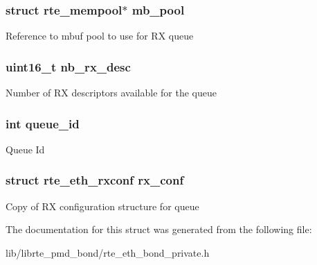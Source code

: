 \subsubsection[{mb\+\_\+pool}]{\setlength{\rightskip}{0pt plus 5cm}struct {\bf rte\+\_\+mempool}$\ast$ mb\+\_\+pool}\label{structbond__rx__queue_a25fec2758cbb0c178303a91f9b947de2}
Reference to mbuf pool to use for R\+X queue \hypertarget{structbond__rx__queue_aaa1aa505a27c4744f950365aafb99484}{}
\subsubsection[{nb\+\_\+rx\+\_\+desc}]{\setlength{\rightskip}{0pt plus 5cm}uint16\+\_\+t nb\+\_\+rx\+\_\+desc}\label{structbond__rx__queue_aaa1aa505a27c4744f950365aafb99484}
Number of R\+X descriptors available for the queue \hypertarget{structbond__rx__queue_a9069963fa1ce9797b853db16f9845d58}{}
\subsubsection[{queue\+\_\+id}]{\setlength{\rightskip}{0pt plus 5cm}int queue\+\_\+id}\label{structbond__rx__queue_a9069963fa1ce9797b853db16f9845d58}
Queue Id \hypertarget{structbond__rx__queue_a88fc26d5b1d1399c0a401f211a5b766f}{}
\subsubsection[{rx\+\_\+conf}]{\setlength{\rightskip}{0pt plus 5cm}struct {\bf rte\+\_\+eth\+\_\+rxconf} rx\+\_\+conf}\label{structbond__rx__queue_a88fc26d5b1d1399c0a401f211a5b766f}
Copy of R\+X configuration structure for queue 

The documentation for this struct was generated from the following file\+:\begin{DoxyCompactItemize}
\item 
lib/librte\+\_\+pmd\+\_\+bond/rte\+\_\+eth\+\_\+bond\+\_\+private.\+h\end{DoxyCompactItemize}
